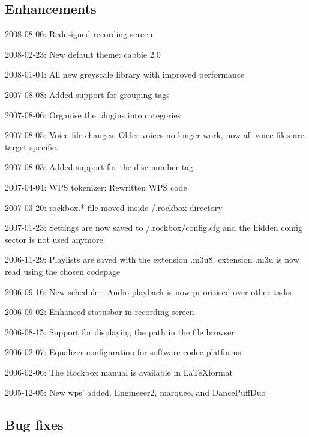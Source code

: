 \subsection{Enhancements}
\begin{changelog}
\item 2008-08-06: Redesigned recording screen
\item 2008-02-23: New default theme: cabbie 2.0
\item 2008-01-04: All new greyscale library with improved performance
\item 2007-08-08: Added support for grouping tags
\item 2007-08-06: Organise the plugins into categories
\item 2007-08-05: Voice file changes. Older voices no longer work, now
  all voice files are target-specific.
\item 2007-08-03: Added support for the disc number tag
\item 2007-04-04: WPS tokenizer: Rewritten WPS code
\item 2007-03-20: rockbox.* file moved inside /.rockbox directory
\item 2007-01-23: Settings are now saved to /.rockbox/config.cfg and
  the hidden config sector is not used anymore
\item 2006-11-29: Playlists are saved with the extension .m3u8,
  extension .m3u is now read using the chosen codepage
\item 2006-09-16: New scheduler. Audio playback is now prioritised
  over other tasks
\item 2006-09-02: Enhanced statusbar in recording screen
\item 2006-08-15: Support for displaying the path in the file browser
\item 2006-02-07: Equalizer configuration for software codec platforms
\item 2006-02-06: The Rockbox manual is available in \LaTeX format
\item 2005-12-05: New wps' added. Engineeer2, marquee, and DancePuffDuo
\end{changelog}

\subsection{Bug fixes}
